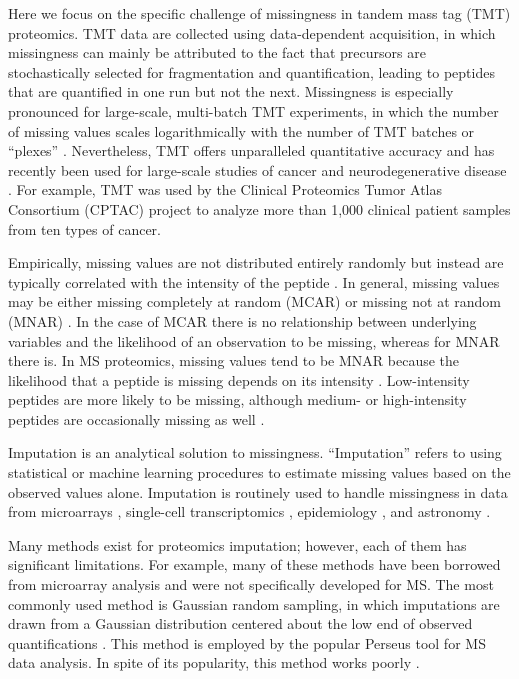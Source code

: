 \documentclass{article}
\begin{document}
Here we focus on the specific challenge of missingness in tandem mass tag (TMT) proteomics. TMT data are collected using data-dependent acquisition, in which missingness can mainly be attributed to the fact that precursors are stochastically selected for fragmentation and quantification, leading to peptides that are quantified in one run but not the next. Missingness is especially pronounced for large-scale, multi-batch TMT experiments, in which the number of missing values scales logarithmically with the number of TMT batches or ``plexes'' \cite{multi-tmt}. Nevertheless, TMT offers unparalleled quantitative accuracy and has recently been used for large-scale studies of cancer and neurodegenerative disease \cite{seyfried-AD-TMT, pan-cancer, CPTAC-S051, savage-2024, CPTAC}. For example, TMT was used by the Clinical Proteomics Tumor Atlas Consortium (CPTAC) project \cite{CPTAC, pan-cancer} to analyze more than 1,000 clinical patient samples from ten types of cancer. 

Empirically, missing values are not distributed entirely randomly but instead are typically correlated with the intensity of the peptide \cite{mengbo-2023}. In general, missing values may be either missing completely at random (MCAR) or missing not at random (MNAR) \cite{rubin-1976}. In the case of MCAR there is no relationship between underlying variables and the likelihood of an observation to be missing, whereas for MNAR there is. In MS proteomics, missing values tend to be MNAR because the likelihood that a peptide is missing depends on its intensity \cite{mengbo-2023}. Low-intensity peptides are more likely to be missing, although medium- or high-intensity peptides are occasionally missing as well \cite{mengbo-2023}. 

Imputation is an analytical solution to missingness. ``Imputation'' refers to using statistical or machine learning procedures to estimate missing values based on the observed values alone. Imputation is routinely used to handle missingness in data from microarrays \cite{knn-impute}, single-cell transcriptomics \cite{ALRA, magic-scRNA}, epidemiology \cite{multi-impute-clinical}, and astronomy \cite{astro-impute1, astro-impute2}. 

Many methods exist for proteomics imputation; however, each of them has significant limitations. For example, many of these methods have been borrowed from microarray analysis and were not specifically developed for MS. The most commonly used method is Gaussian random sampling, in which imputations are drawn from a Gaussian distribution centered about the low end of observed quantifications \cite{ms-impute-bench}. This method is employed by the popular Perseus tool \cite{Perseus} for MS data analysis. In spite of its popularity, this method works poorly \cite{ms-impute-bench}.
\end{document}
